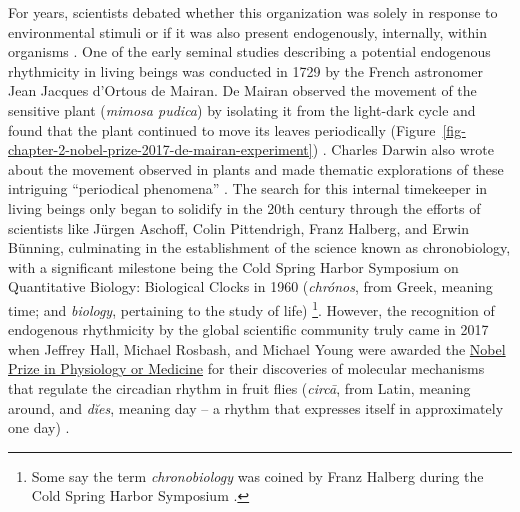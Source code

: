 \documentclass[
12pt,
openright,
oneside,
a4paper,
chapter=TITLE,
section=TITLE,
french,
spanish,
brazil,
english
]{abntex2}
\begin{document}
For years, scientists debated whether this organization was solely in
response to environmental stimuli or if it was also present
endogenously, internally, within organisms \autocite{rotenberg2003}. One
of the early seminal studies describing a potential endogenous
rhythmicity in living beings was conducted in 1729 by the French
astronomer Jean Jacques d'Ortous de Mairan. De Mairan observed the
movement of the sensitive plant (\emph{mimosa pudica}) by isolating it
from the light-dark cycle and found that the plant continued to move its
leaves periodically
(Figure~\ref{fig-chapter-2-nobel-prize-2017-de-mairan-experiment})
\autocite{mairan1729,rotenberg2003}. Charles Darwin also wrote about the
movement observed in plants and made thematic explorations of these
intriguing ``periodical phenomena'' \autocite{andrade2024}. The search
for this internal timekeeper in living beings only began to solidify in
the 20th century through the efforts of scientists like Jürgen Aschoff,
Colin Pittendrigh, Franz Halberg, and Erwin Bünning, culminating in the
establishment of the science known as chronobiology, with a significant
milestone being the Cold Spring Harbor Symposium on Quantitative
Biology: Biological Clocks in 1960 (\emph{chrónos}, from Greek, meaning
time; and \emph{biology}, pertaining to the study of life)
\autocite{rotenberg2003,coldspringharborlaboratory}\footnote{Some say
  the term \emph{chronobiology} was coined by Franz Halberg during the
  Cold Spring Harbor Symposium \autocite[21]{menna-barreto2023}.}.
However, the recognition of endogenous rhythmicity by the global
scientific community truly came in 2017 when Jeffrey Hall, Michael
Rosbash, and Michael Young were awarded the
\href{https://www.nobelprize.org/prizes/medicine/2017/press-release/}{Nobel
Prize in Physiology or Medicine} for their discoveries of molecular
mechanisms that regulate the circadian rhythm in fruit flies
(\emph{circā}, from Latin, meaning around, and \emph{dĭes}, meaning day
\autocite{latinitium} -- a rhythm that expresses itself in approximately
one day) \autocite{nobelprizeoutreachab}.
\end{document}
